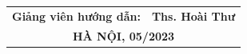 \documentclass[BTL.tex]{subfiles}
\begin{document}
\begin{titlepage}
\begin{center}
{\vspace{0.5cm}
\begin{table}[H]
\centering

\begin{tabular}{ll}
\multicolumn{1}{c}{\textbf{\large{Giảng viên hướng dẫn:}}} & {\textbf{\large{Ths.  Hoài Thư}}} \hspace{0.5cm} \\[2cm]
\multicolumn{2}{c}{\textbf{\large{HÀ NỘI, 05/2023}}}                                            
\end{tabular}%

\end{table}}
\end{center}



\end{titlepage}
\end{document}

